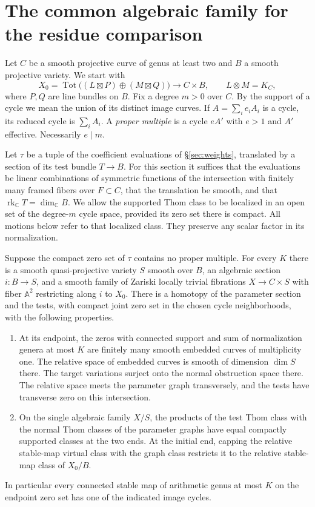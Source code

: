 \section{The common algebraic family for the residue comparison}\label{sec:deformations}

Let $C$ be a smooth projective curve of genus at least two and $B$ a
smooth projective variety. We start with
\[
 X_0=\operatorname{Tot}\big((L\boxtimes P)\oplus(M\boxtimes Q)\big)
       \longrightarrow C\times B,
 \qquad L\otimes M=K_C ,
\]
where $P,Q$ are line bundles on $B$. Fix a degree $m>0$ over $C$.
By the support of a cycle we mean the union of its distinct image
curves. If $A=\sum_i e_i A_i$ is a cycle, its reduced cycle is
$\sum_i A_i$. A \emph{proper multiple} is a cycle $eA'$ with
$e>1$ and $A'$ effective. Necessarily $e\mid m$.

Let $\tau$ be a tuple of the coefficient evaluations of
\S\ref{sec:weights}, translated by a section of its test bundle
$T\to B$. For this section it suffices that the evaluations be
linear combinations of symmetric functions of the intersection with
finitely many framed fibers over $F\subset C$, that the translation
be smooth, and that $\operatorname{rk}_{\mathbb C}T=\dim_{\mathbb C}B$.
We allow the supported Thom class to be localized in an open set of the
degree-$m$ cycle space, provided its zero set there is compact. All
motions below refer to that localized class. They preserve any scalar
factor in its normalization.

\begin{theorem}\label{thm:separate}
Suppose the compact zero set of $\tau$ contains no proper multiple.
For every $K$ there is a smooth quasi-projective variety $S$ smooth
over $B$, an algebraic section $i:B\to S$, and a smooth family of
Zariski locally trivial fibrations $X\to C\times S$ with fiber $\mathbb A^2$ restricting along $i$ to $X_0$.
There is a homotopy of the parameter section and the tests, with compact
joint zero set in the chosen cycle neighborhoods, with the following
properties.
\begin{enumerate}
\item At its endpoint, the zeros with connected support and sum of
normalization genera at most $K$ are finitely many smooth embedded
curves of multiplicity one. The relative space of embedded curves is
smooth of dimension $\dim S$ there. The target variations surject onto the normal obstruction space
there. The relative space meets the parameter graph transversely, and
the tests have transverse zero on this intersection.
\item On the single algebraic family $X/S$, the products of the test
Thom class with the normal Thom classes of the parameter graphs have
equal compactly supported classes at the two ends. At the initial end,
capping the relative stable-map virtual class with the graph class
restricts it to the relative stable-map class of $X_0/B$.
\end{enumerate}
In particular every connected stable map of arithmetic genus at most
$K$ on the endpoint zero set has one of the indicated image cycles.
\end{theorem}


